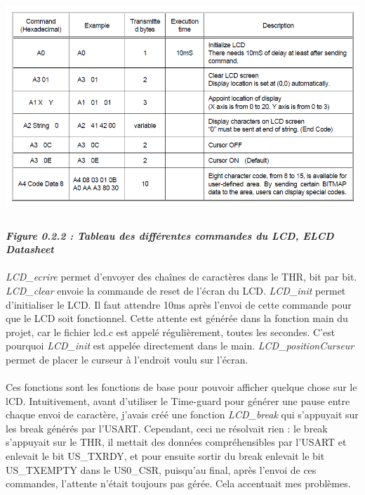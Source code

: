 \documentclass[a4paper]{report}
\begin{document}
				\includegraphics[width=14cm,height=8cm]{images/commandesLCD.png}
				\paragraph{\textit{Figure 0.2.2 : Tableau des différentes commandes du LCD, ELCD Datasheet}}
				\paragraph{}
					\emph{LCD\_ecrire} permet d'envoyer des chaînes de caractères dans le THR, bit par bit.
					\emph{LCD\_clear} envoie la commande de reset de l'écran du LCD.
					\emph{LCD\_init} permet d'initialiser le LCD. Il faut attendre 10ms après l'envoi de cette commande pour que le LCD soit fonctionnel. Cette attente est générée dans la fonction main du projet, car le fichier lcd.c est appelé régulièrement, toutes les secondes. C'est pourquoi \emph{LCD\_init} est appelée directement dans le main.
					\emph{LCD\_positionCurseur} permet de placer le curseur à l'endroit voulu sur l'écran.

				\paragraph{}
					Ces fonctions sont les fonctions de base pour pouvoir afficher quelque chose sur le lCD. Intuitivement, avant d'utiliser le Time-guard pour générer une pause entre chaque envoi de caractère, j'avais créé une fonction \emph{LCD\_break} qui s'appuyait sur les break générés par l'USART. Cependant, ceci ne résolvait rien : le break s'appuyait sur le THR, il mettait des données compréhensibles par l'USART et enlevait le bit US\_TXRDY, et pour ensuite sortir du break enlevait le bit US\_TXEMPTY dans le US0\_CSR, puisqu'au final, après l'envoi de ces commandes, l'attente n'était toujours pas gérée. Cela accentuait mes problèmes.
\end{document}
